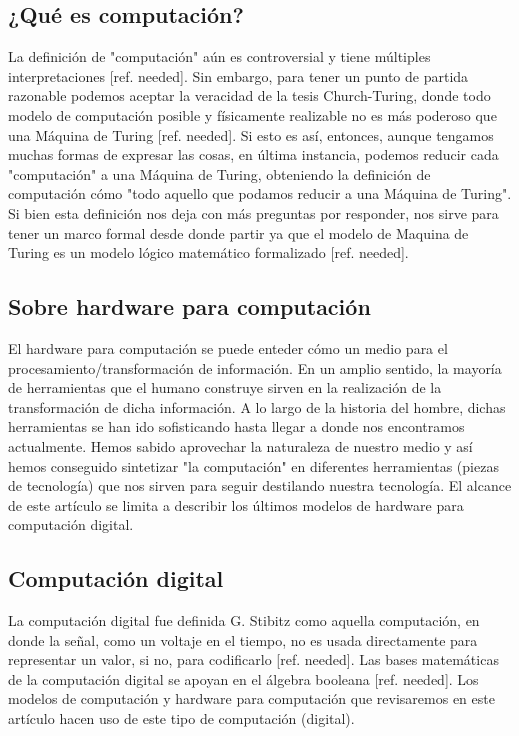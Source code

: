 \documentclass[conference]{IEEEtran}
\begin{document}
\subsection{¿Qué es computación?}
La definición de "computación" aún es controversial y tiene múltiples interpretaciones [ref. needed]. Sin embargo, para tener un punto de partida razonable podemos aceptar la veracidad de la tesis Church-Turing, donde todo modelo de computación posible y físicamente realizable no es más poderoso que una Máquina de Turing [ref. needed]. Si esto es así, entonces, aunque tengamos muchas formas de expresar las cosas, en última instancia, podemos reducir cada "computación" a una Máquina de Turing, obteniendo la definición de computación cómo "todo aquello que podamos reducir a una Máquina de Turing". Si bien esta definición nos deja con más preguntas por responder, nos sirve para tener un marco formal desde donde partir ya que el modelo de Maquina de Turing es un modelo lógico matemático formalizado [ref. needed].

\subsection{Sobre hardware para computación}
El hardware para computación se puede enteder cómo un medio para el procesamiento/transformación de información. En un amplio sentido, la mayoría de herramientas que el humano construye sirven en la realización de la transformación de  dicha información. A lo largo de la historia del hombre, dichas herramientas se han ido sofisticando hasta llegar a donde nos encontramos actualmente. Hemos sabido aprovechar la naturaleza de nuestro medio y así hemos conseguido sintetizar "la computación" en diferentes herramientas (piezas de tecnología) que nos sirven para seguir destilando nuestra tecnología. El alcance de este artículo se limita a describir los últimos modelos de hardware para computación digital.

\subsection{Computación digital}
La computación digital fue definida G. Stibitz como aquella computación, en donde la señal, como un voltaje en el tiempo, no es usada directamente para representar un valor, si no, para codificarlo [ref. needed]. Las bases matemáticas de la computación digital se apoyan en el álgebra booleana [ref. needed]. Los modelos de computación y hardware para computación que revisaremos en este artículo hacen uso de este tipo de computación (digital).
\end{document}
